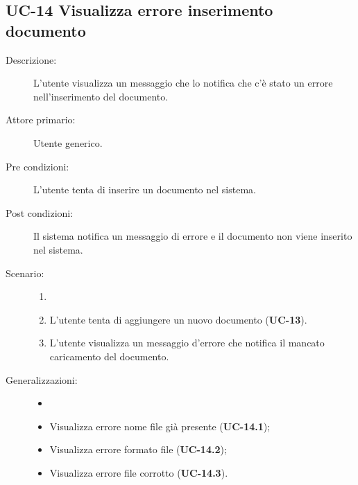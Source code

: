 \subsection{UC-14 Visualizza errore inserimento documento}
\begin{description}
    \item[Descrizione:] L'utente visualizza un messaggio che lo notifica che c'è stato un errore nell'inserimento del documento.
    \item[Attore primario:] Utente generico.
    \item[Pre condizioni:] L'utente tenta di inserire un documento nel sistema.
    \item[Post condizioni:] Il sistema notifica un messaggio di errore e il documento non viene inserito nel sistema.
    \item[Scenario:]
    \begin{enumerate}
        \item[]
        \item L’utente tenta di aggiungere un nuovo documento (\textbf{UC-13}).
        \item L'utente visualizza un messaggio d'errore che  notifica il mancato caricamento del documento. 
    \end{enumerate}
    \item[Generalizzazioni:]
    \begin{itemize}
        \item[] 
        \item Visualizza errore nome file già presente (\textbf{UC-14.1});
        \item Visualizza errore formato file (\textbf{UC-14.2});
        \item Visualizza errore file corrotto (\textbf{UC-14.3}).
    \end{itemize}
\end{description}

